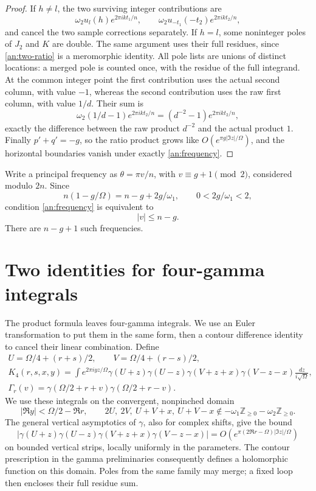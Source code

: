 \documentclass[11pt]{article}
\numberwithin{equation}{section}
\theoremstyle{definition}
\theoremstyle{remark}
\newcommand{\Z}{\mathbb Z}
\begin{document}
\begin{proof}
If $h\ne l$, the two surviving integer contributions are
\[
 \omega_2 u_l(h)e^{2\pi ikt_1/n},\qquad
 \omega_2 u_{-t_1}(-t_2)e^{2\pi ikt_2/n},
\]
and cancel the two sample corrections separately.  If $h=l$, some noninteger
poles of $J_2$ and $K$ are double.  The same argument uses their
full residues, since \eqref{an:two-ratio} is a meromorphic identity.
All pole lists are unions of distinct locations: a merged pole is
counted once, with the residue of the full integrand.
At the common integer point the first contribution uses the actual
second column, with value $-1$, whereas the second contribution
uses the raw first column, with value $1/d$.  Their sum is
\[
 \omega_2(1/d-1)e^{2\pi ikt_2/n}=(d^{-2}-1)e^{2\pi ikt_2/n},
\]
exactly the difference between the raw product $d^{-2}$ and the
actual product $1$.  Finally $p'+q'=-g$, so the ratio product grows like
$O(e^{\pi g|\Im z|/\Omega})$, and the horizontal boundaries vanish
under exactly \eqref{an:frequency}.
\end{proof}

Write a principal frequency as $\theta=\pi v/n$, with
$v\equiv g+1\pmod2$, considered modulo $2n$.  Since
\[
 n(1-g/\Omega)=n-g+2g/\omega_1,\qquad 0<2g/\omega_1<2,
\]
condition \eqref{an:frequency} is equivalent to
\begin{equation}
 |v|\le n-g.
 \label{an:restricted-set}
\end{equation}
There are $n-g+1$ such frequencies.

\section{Two identities for four-gamma integrals}
\label{an:euler-section}

The product formula leaves four-gamma integrals.  We use an Euler
transformation to put them in the same form, then a contour difference
identity to cancel their linear combination.  Define
\begin{gather*}
 U=\Omega/4+(r+s)/2,\qquad V=\Omega/4+(r-s)/2,\\
 K_4(r,s,x,y)=\int e^{2\pi iyz/\Omega}
       \gamma(U+z)\gamma(U-z)
       \gamma(V+z+x)\gamma(V-z-x)\frac{dz}{i\sqrt\Omega},\\
 \Gamma_r(v)=\gamma(\Omega/2+r+v)\gamma(\Omega/2+r-v).
\end{gather*}
We use these integrals on the convergent, nonpinched domain
\[
 |\Re y|<\Omega/2-\Re r,\qquad
 2U,\ 2V,\ U+V+x,\ U+V-x
       \notin-\omega_1\Z_{\ge0}-\omega_2\Z_{\ge0}.
\]
The general vertical asymptotics of $\gamma$, also for complex shifts,
give the bound
\[
 \left|\gamma(U+z)\gamma(U-z)
          \gamma(V+z+x)\gamma(V-z-x)\right|
 =O\!\left(e^{\pi(2\Re r-\Omega)|\Im z|/\Omega}\right)
\]
on bounded vertical strips, locally uniformly in the parameters.
The contour prescription in the gamma preliminaries consequently
defines a holomorphic function on this domain.  Poles from the same
family may merge; a fixed loop then encloses their full residue sum.
\end{document}
